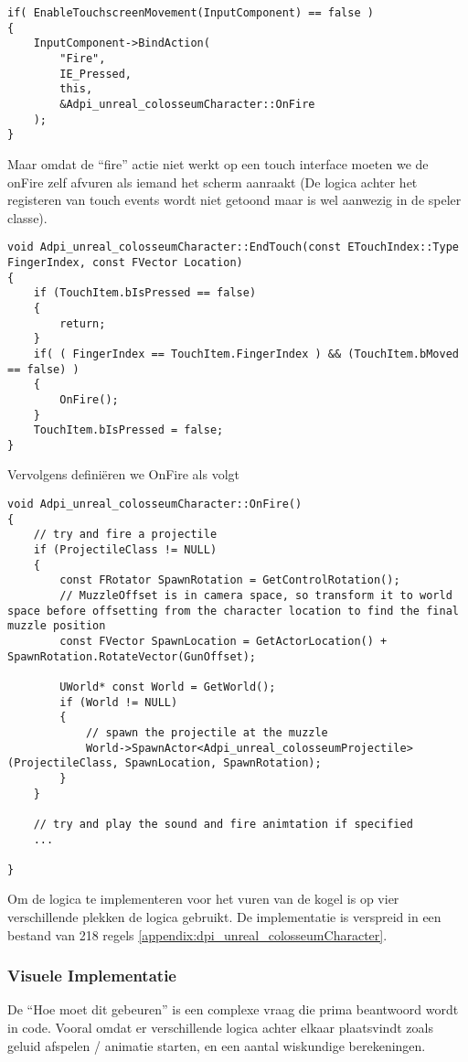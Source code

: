 \begin{lstlisting}[caption=Koppellen van de Fire actie aan de OndFire functie]
if( EnableTouchscreenMovement(InputComponent) == false )
{
	InputComponent->BindAction(
		"Fire", 
		IE_Pressed, 
		this, 
		&Adpi_unreal_colosseumCharacter::OnFire
	);
}
\end{lstlisting}
Maar omdat de “fire” actie niet werkt op een touch interface moeten we de onFire zelf afvuren als iemand het scherm aanraakt (De logica achter het registeren van touch events wordt niet getoond maar is wel aanwezig in de speler classe).

\begin{lstlisting}[caption=Aanroepen van de OnFire functie tijdens het EndTouch event]
void Adpi_unreal_colosseumCharacter::EndTouch(const ETouchIndex::Type FingerIndex, const FVector Location)
{
	if (TouchItem.bIsPressed == false)
	{
		return;
	}
	if( ( FingerIndex == TouchItem.FingerIndex ) && (TouchItem.bMoved == false) )
	{
		OnFire();
	}
	TouchItem.bIsPressed = false;
}
\end{lstlisting}
Vervolgens definiëren we OnFire als volgt

\begin{lstlisting}[caption=Implementatie van de OnFire functie]
void Adpi_unreal_colosseumCharacter::OnFire()
{ 
	// try and fire a projectile
	if (ProjectileClass != NULL)
	{
		const FRotator SpawnRotation = GetControlRotation();
		// MuzzleOffset is in camera space, so transform it to world space before offsetting from the character location to find the final muzzle position
		const FVector SpawnLocation = GetActorLocation() + SpawnRotation.RotateVector(GunOffset);

		UWorld* const World = GetWorld();
		if (World != NULL)
		{
			// spawn the projectile at the muzzle
			World->SpawnActor<Adpi_unreal_colosseumProjectile>(ProjectileClass, SpawnLocation, SpawnRotation);
		}
	}

	// try and play the sound and fire animtation if specified
	...

}
\end{lstlisting}
Om de logica te implementeren voor het vuren van de kogel is op vier verschillende plekken de logica gebruikt. De implementatie is verspreid in een bestand van 218 regels \ref{appendix:dpi_unreal_colosseumCharacter}.

\subsubsection{Visuele Implementatie}
De “Hoe moet dit gebeuren” is een complexe vraag die prima beantwoord wordt in code. Vooral omdat er verschillende logica achter elkaar plaatsvindt zoals geluid afspelen / animatie starten, en een aantal wiskundige berekeningen. 

